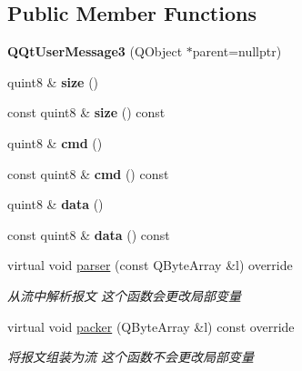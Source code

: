 \subsection*{Public Member Functions}
\begin{DoxyCompactItemize}
\item 
\mbox{\label{class_q_qt_user_message3_aed5797b0ea7651fbbf152c36d22c3e96}} 
{\bfseries Q\+Qt\+User\+Message3} (Q\+Object $\ast$parent=nullptr)
\item 
\mbox{\label{class_q_qt_user_message3_aa0c660e073d5f7d9a281a04cd7487ee9}} 
quint8 \& {\bfseries size} ()
\item 
\mbox{\label{class_q_qt_user_message3_ab3fdc1e6122dbb91b70ff13a5b58544e}} 
const quint8 \& {\bfseries size} () const
\item 
\mbox{\label{class_q_qt_user_message3_a4c4742d4d39ff0e6724bd54a9e9ccf3c}} 
quint8 \& {\bfseries cmd} ()
\item 
\mbox{\label{class_q_qt_user_message3_a265ac9b9417206db40929431509cbf26}} 
const quint8 \& {\bfseries cmd} () const
\item 
\mbox{\label{class_q_qt_user_message3_a454475306401ea7c0bb65192b3fa84d4}} 
quint8 \& {\bfseries data} ()
\item 
\mbox{\label{class_q_qt_user_message3_a02a07a35d5086be92a99fc8c05bd95e4}} 
const quint8 \& {\bfseries data} () const
\item 
virtual void \mbox{\hyperlink{class_q_qt_user_message3_a903199240e4029b12db72a58bc0be53b}{parser}} (const Q\+Byte\+Array \&l) override
\begin{DoxyCompactList}\small\item\em 从流中解析报文 这个函数会更改局部变量 \end{DoxyCompactList}\item 
virtual void \mbox{\hyperlink{class_q_qt_user_message3_a935dc52a0f45e3fafcb1d1bed25dc23e}{packer}} (Q\+Byte\+Array \&l) const override
\begin{DoxyCompactList}\small\item\em 将报文组装为流 这个函数不会更改局部变量 \end{DoxyCompactList}\end{DoxyCompactItemize}



